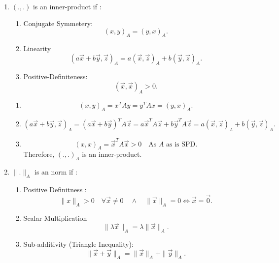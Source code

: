\documentclass{report}
\begin{document}
\begin{solution}
	\begin{enumerate}[label=(\alph*)]
		\item $\left( .,. \right) $ is an inner-product if :
		      \begin{enumerate}[label=(\roman*)]
			      \item  Conjugate Symmetery: \\
			            \[
				            \left( x,y \right)_{A}  = {\left(y,x\right)_A}
				            .\]
			      \item Linearity \\
			            \[
				            \left( a\vec{x}+b\vec{y}, \vec z \right)_A  = a \left( \vec x,\vec z  \right)_A +b\left(\vec  y,\vec z \right)_A
				            .\]
			      \item Positive-Definiteness:\\
			            \[
				            \left( \vec x, \vec x \right)_A  > 0
				            .\]
		      \end{enumerate}
		      \begin{enumerate}[label = (\roman*)]
			      \item \[
				            \left( x,y \right)_A = x^{T}Ay = y^{T}Ax = \left( y,x \right)_A
				            .\]
			      \item
			            \[
				            \left( a\vec{x}+b\vec{y}, \vec z \right)_A = (a\vec{x}+b\vec{y})^{T} A \vec z=  a\vec{x}^{T} A \vec z+b\vec{y}^{T} A \vec z  = a \left( \vec x,\vec z  \right)_A +b\left(\vec  y,\vec z \right)_A
				            .\]
			      \item
			            \[
				            \left( x,x \right)_A = \vec x^{T} A  \vec x >0 \quad \text{As $A$ as is SPD}
				            .\]
			            Therefore, $\left( .,. \right)_A $ is an inner-product.
		      \end{enumerate}
		\item $\|.\|_A$ is an norm if :
		      \begin{enumerate}[label=(\roman*)]
			      \item  Positive Definitness : \\
			            \[
				            \|x\|_A > 0 \quad \forall \vec x \neq 0 \quad \land \quad \|\vec x\|_A = 0 \iff \vec x = \vec 0
				            .\]
			      \item Scalar Multiplication\\
			            \[
				            \|\lambda \vec x \|_A = \lambda \|\vec x\|_A
				            .\]
			      \item Sub-additivity (Triangle Inequality):\\
			            \[
				            \|\vec x+ \vec y\|_A = \| \vec x\|_A  + \| \vec y \|_A
				            .\]


\end{enumerate}
\end{enumerate}
\end{solution}
\end{document}
